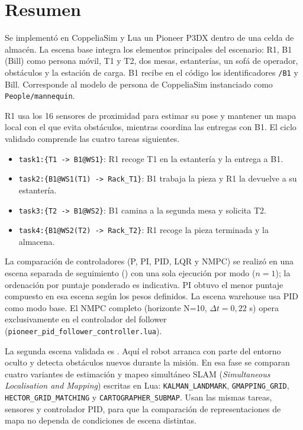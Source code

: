 \chapter*{Resumen}

\begin{summarybox}
Se implementó en CoppeliaSim y Lua un Pioneer P3DX dentro de
una celda de almacén. La escena base  integra los
elementos principales del escenario: R1, B1 (Bill) como persona móvil, T1 y T2,
dos mesas, estanterías, un sofá de operador, obstáculos y la estación de carga. B1 recibe en el código los identificadores \texttt{/B1} y Bill.
Corresponde al modelo de persona de CoppeliaSim instanciado como \texttt{People/mannequin}.
\end{summarybox}

R1 usa los 16 sensores de proximidad para estimar su pose y mantener un mapa
local con el que evita obstáculos, mientras coordina las entregas con B1. El
ciclo validado comprende las cuatro tareas siguientes.

\begin{itemize}
  \item \texttt{task1:\{T1 -> B1@WS1\}}: R1 recoge T1 en la estantería y la entrega a B1.
  \item \texttt{task2:\{B1@WS1(T1) -> Rack\_T1\}}: B1 trabaja la pieza y R1 la devuelve a su estantería.
  \item \texttt{task3:\{T2 -> B1@WS2\}}: B1 camina a la segunda mesa y solicita T2.
  \item \texttt{task4:\{B1@WS2(T2) -> Rack\_T2\}}: R1 recoge la pieza terminada y la almacena.
\end{itemize}

La comparación de controladores (P, PI, PID, LQR y NMPC) se realizó en una escena
separada de seguimiento () con una sola ejecución
por modo (\(n=1\)); la ordenación por puntaje ponderado es indicativa. PI obtuvo el
menor puntaje compuesto en esa escena según los pesos definidos. La escena warehouse usa PID como modo
base. El NMPC completo (horizonte N=10, \(\Delta t=0{,}22\) s) opera exclusivamente
en el controlador del follower (\texttt{pioneer\_pid\_follower\_controller.lua}).

La segunda escena validada es . Aquí el
robot arranca con parte del entorno oculto y detecta obstáculos nuevos durante la
misión. En esa fase se comparan cuatro variantes de estimación y mapeo simultáneo
SLAM (\textit{Simultaneous Localisation and Mapping}) escritas en Lua:
\texttt{KALMAN\_LANDMARK}, \texttt{GMAPPING\_GRID},
\texttt{HECTOR\_GRID\_MATCHING} y \texttt{CARTOGRAPHER\_SUBMAP}. Usan las
mismas tareas, sensores y controlador PID, para que la comparación de representaciones
de mapa no dependa de condiciones de escena distintas.

